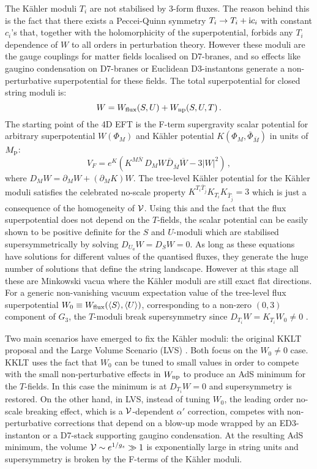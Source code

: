 \documentclass[11pt,a4paper]{article}
\newcommand{\be}{\begin{equation}}
\newcommand{\ee}{\end{equation}}
\newcommand{\vo}{\mathcal{V}}
\def\vo{{{\cal{V}}}}
\begin{document}
The K\"ahler moduli $T_i$ are not stabilised by 3-form fluxes. The reason behind this is the fact that there exists a Peccei-Quinn symmetry $T_i\rightarrow T_i +{\rm i} c_i$ with constant $c_i$'s that, together with the holomorphicity of the superpotential, forbids any $T_i$ dependence of $W$ to all orders in perturbation theory. However these moduli are the gauge couplings for matter fields localised on D7-branes, and so effects like gaugino condensation on D7-branes or Euclidean D3-instantons \cite{Blumenhagen:2009qh} generate a non-perturbative superpotential for these fields. The total superpotential for closed string moduli is:
\be
W=W_{\rm flux}(S,U)+W_{\rm np}(S,U,T)\,.
\label{Wtotal}
\ee
The starting point  of the 4D EFT is the F-term supergravity scalar potential for arbitrary superpotential $W(\Phi_M)$ and K\"ahler potential $K(\Phi_M, \bar{\Phi}_{\bar{M}})$ in units of $M_{\rm p}$:
\be
V_F= e^K\left(K^{M\overline{N}}\, D_M W \overline{D}_{\overline{M}} \overline{W} - 3|W|^2\right) \,,
\label{VF}
\ee
where $D_M W = \partial_M W + \left(\partial_M K\right) W$. The tree-level K\"ahler potential for the K\"ahler moduli satisfies the celebrated no-scale property $K^{T_i\bar{T}_{\bar{j}}} K_{T_i} K_{\bar{T}_{\bar{j}}}=3$ which is just a consequence of the homogeneity of $\vo$. Using this and the fact that the flux superpotential does not depend on the $T$-fields, the scalar potential can be easily shown to be positive definite for the $S$ and $U$-moduli which are stabilised supersymmetrically by solving $D_{U_a} W=D_SW=0$. As long as these equations have solutions for different values of the quantised fluxes, they generate the huge number of solutions that define the string landscape. However at this stage all these are Minkowski vacua where the K\"ahler moduli are still exact flat directions. For a generic non-vanishing vacuum expectation value of the tree-level flux superpotential $W_0\equiv W_{\rm flux}(\langle S\rangle,\langle U\rangle)$, corresponding to a non-zero $(0,3)$ component of $G_3$, the $T$-moduli break supersymmetry since $D_{T_i} W = K_{T_i} W_0\neq 0$ \cite{Giddings:2001yu}.

Two main scenarios have emerged to fix the K\"ahler moduli: the original KKLT proposal \cite{Kachru:2003aw} and the Large Volume Scenario (LVS) \cite{Balasubramanian:2005zx, Conlon:2005ki, Cicoli:2008va}. Both focus on the $W_0\neq 0$ case. KKLT uses the fact that $W_0$ can be tuned to small values in order to compete with the small non-perturbative effects in $W_{\rm np}$ to produce an AdS minimum for the $T$-fields. In this case the minimum is at $D_{T_i} W=0$ and supersymmetry is restored. On the other hand, in LVS, instead of tuning $W_0$, the leading order no-scale breaking effect, which is a $\vo$-dependent $\alpha'$ correction, competes with non-perturbative corrections that depend on a blow-up mode wrapped by an ED3-instanton or a D7-stack supporting gaugino condensation. At the resulting AdS minimum, the volume $\vo\sim e^{1/g_s}\gg 1$ is exponentially large in string units and supersymmetry is broken by the F-terms of the K\"ahler moduli.
\end{document}
